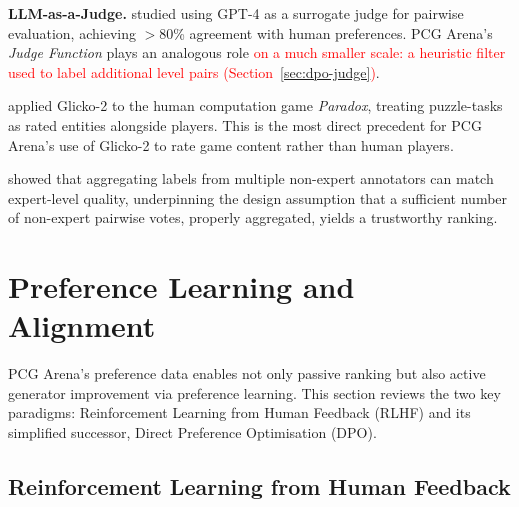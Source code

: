 \documentclass[shortabstract, mgr, english]{iithesis}
\newcommand{\changed}[1]{\textcolor{red}{#1}}
\begin{document}
\textbf{LLM-as-a-Judge.} \citet{zheng2023judging} studied using GPT-4 as a
surrogate judge for pairwise evaluation, achieving $>$80\% agreement with human
preferences. PCG Arena's \emph{Judge Function} plays an analogous role \changed{on a
much smaller scale: a heuristic filter used to label additional level pairs
(Section~\ref{sec:dpo-judge})}.

\citet{sarkar2017glicko2} applied Glicko-2 to the human computation game
\emph{Paradox}, treating puzzle-tasks as rated entities alongside players.
This is the most direct precedent for PCG Arena's use of Glicko-2 to rate
game content rather than human players.

\citet{snow2008cheap} showed that aggregating labels from multiple non-expert
annotators can match expert-level quality, underpinning the design assumption
that a sufficient number of non-expert pairwise votes, properly aggregated,
yields a trustworthy ranking.


\section{Preference Learning and Alignment}
\label{sec:bg-alignment}

PCG Arena's preference data enables not only passive ranking but also active
generator improvement via preference learning. This section reviews the two key
paradigms: Reinforcement Learning from Human Feedback (RLHF) and its simplified
successor, Direct Preference Optimisation (DPO).

\subsection{Reinforcement Learning from Human Feedback}
\label{subsec:bg-rlhf}
\end{document}
